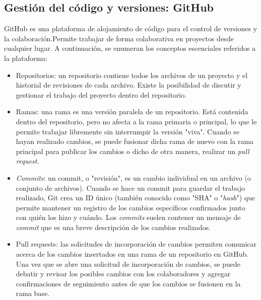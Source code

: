 \subsection{Gestión del código y versiones: GitHub}
GitHub es una plataforma de alojamiento de código para el control de versiones y la colaboración.Permite trabajar de forma colaborativa en proyectos desde cualquier lugar. A continuación, se enumeran los conceptos escenciales referidos a la plataforma:

\begin{itemize}
\item Repositorios: un repositorio contiene todos los archivos de un proyecto y el historial de revisiones de cada archivo. Existe la posibilidad de discutir y gestionar el trabajo del proyecto dentro del repositorio.
\item Ramas: una rama es una versión paralela de un repositorio. Está contenida dentro del repositorio, pero no afecta a la rama primaria o principal, lo que le permite trabajar libremente sin interrumpir la versión "viva". Cuando se hayan realizado cambios, se puede  fusionar dicha rama de nuevo con la rama principal para publicar los cambios o dicho de otra manera, realizar un \textit{pull request}.
\item \textit{Commits}: un commit, o "revisión", es un cambio individual en un archivo (o conjunto de archivos). Cuando se hace un commit para guardar el trabajo realizado, Git crea un ID único (también conocido como "SHA" o "\textit{hash}") que permite mantener un registro de los cambios específicos confirmados junto con quién los hizo y cuándo. Los \textit{commits} suelen contener un mensaje de \textit{commit} que es una breve descripción de los cambios realizados.
\item Pull requests: las solicitudes de incorporación de cambios permiten comunicar acerca de los cambios insertados en una rama de un repositorio en GitHub. Una vez que se abre una solicitud de incorporación de cambios, se puede debatir y revisar los posibles cambios con los colaboradores y agregar confirmaciones de seguimiento antes de que los cambios se fusionen en la rama base.
\end{itemize}

